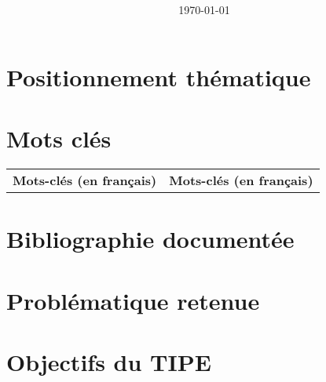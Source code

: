 \documentclass{article}
\title{\textbf{}}
\author{}
\date{\today}
\begin{document}
\maketitle

\section*{Positionnement thématique}
\textit{}

\section*{Mots clés}
\begin{tabular}{ll}
\textbf{Mots-clés (en français)} & \textbf{Mots-clés (en français)}\\

\end{tabular}

\section*{Bibliographie documentée}


\section*{Problématique retenue}


\section*{Objectifs du TIPE}
\begin{enumerate}

\end{enumerate}



\end{document}
